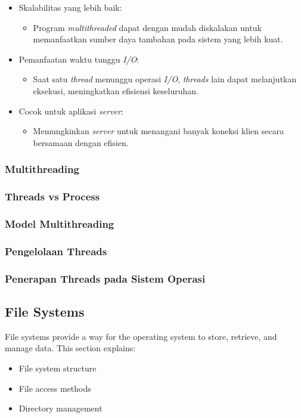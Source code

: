 \documentclass[12pt]{article}
\begin{document}
\begin{itemize}
    \item Skalabilitas yang lebih baik:
    \begin{itemize}
        \item Program \textit{multithreaded} dapat dengan mudah diskalakan untuk memanfaatkan sumber daya tambahan pada sistem yang lebih kuat.
    \end{itemize}
    
    \item Pemanfaatan waktu tunggu \textit{I/O}:
    \begin{itemize}
        \item Saat satu \textit{thread} menunggu operasi \textit{I/O}, \textit{threads} lain dapat melanjutkan eksekusi, meningkatkan efisiensi keseluruhan.
    \end{itemize}
    
    \item Cocok untuk aplikasi \textit{server}:
    \begin{itemize}
        \item Memungkinkan \textit{server} untuk menangani banyak koneksi klien secara bersamaan dengan efisien.
    \end{itemize}
\end{itemize}
\subsubsection{Multithreading}
\subsubsection{Threads vs Process}
\subsubsection{Model Multithreading}
\subsubsection{Pengelolaan Threads}
\subsubsection{Penerapan Threads pada Sistem Operasi}


\subsection{File Systems}
File systems provide a way for the operating system to store, retrieve, and manage data. This section explains:
\begin{itemize}
    \item File system structure
    \item File access methods
    \item Directory management
\end{itemize}
\end{document}

